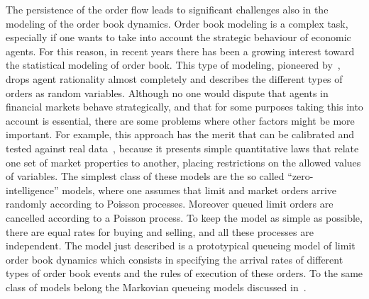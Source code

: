 \documentclass[12pt]{iopart}
\begin{document}
The persistence of the order flow leads to significant challenges also in the modeling of the order book dynamics. Order book modeling is a complex task, especially if one wants to take into account the strategic behaviour of economic agents. For this reason, in recent years there has been a growing interest toward the statistical modeling of order book. This type of modeling, pioneered by~\cite{daniels2003quantitative,smith2003statistical}, drops agent rationality almost completely and describes the different types of orders as  random variables. Although no one would dispute that agents in financial markets behave strategically, and that for some purposes taking this into account is essential, there are some problems where other factors might be more important. For example, this approach has the merit that can be calibrated and tested against real data~\cite{farmer2005predictive,cont2013price}, because it presents simple quantitative laws that relate one set of market properties to another, placing restrictions on the allowed values of variables. The simplest class of these models are the so called “zero-intelligence” models, where one assumes that limit and market orders arrive randomly according to Poisson processes. Moreover queued limit orders are cancelled according to a Poisson process. To keep the model as simple as possible, there are equal rates for buying and selling, and all these processes are independent. The model just described is a prototypical queueing model of limit order book dynamics which consists in specifying the arrival rates of different types of order book events and the rules of execution of these orders. To the same class of models belong the Markovian queueing models discussed in~\cite{cont2010stochastic,cont2013price}. 
\end{document}
